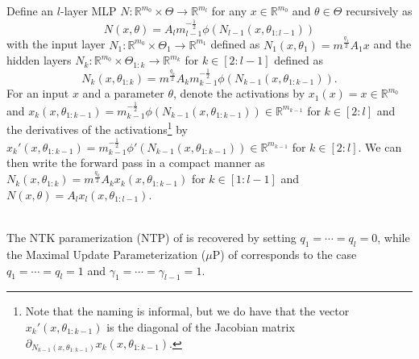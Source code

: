 \documentclass[twoside,11pt]{article}
\newcommand{\R}{\mathbb{R}}
\begin{document}
Define an $l$-layer MLP $N : \R^{m_0} \times \Theta \to \R^{m_l}$ for any $x \in \R^{m_0}$ and $\theta \in \Theta$ recursively as 
\[
N(x,\theta) = A_l m_{l-1}^{-\frac{1}{2}} \phi(N_{l-1}(x,\theta_{1 : l-1}))
\]
with the input layer $N_1 : \R^{m_0} \times \Theta_1 \to \R^{m_1}$ defined as $N_1(x,\theta_1) = m^{\frac{q_1}{2}} A_1 x$ and the hidden layers $N_k : \R^{m_0} \times \Theta_{1:k} \to \R^{m_k}$ for $k \in [2:l-1]$ defined as
\[
N_k(x,\theta_{1:k}) = m^{\frac{q_k}{2}} A_k m_{k-1}^{-\frac{1}{2}} \phi(N_{k-1}(x,\theta_{1 : k-1})).
\]
For an input $x$ and a parameter $\theta$, denote the activations by $x_1(x) = x \in \R^{m_0}$ and $x_k(x, \theta_{1 : k-1}) = m_{k-1}^{-\frac{1}{2}} \phi(N_{k-1}(x, \theta_{1 : k-1})) \in \R^{m_{k-1}}$ for $k \in [2:l]$ and the derivatives of the activations\footnote{Note that the naming is informal, but we do have that the vector $x_k'(x,\theta_{1 : k-1})$ is the diagonal of the Jacobian matrix $\partial_{N_{k-1}(x,\theta_{1 : k-1})} x_k(x, \theta_{1 : k-1})$.} by $x_k'(x,\theta_{1 : k-1}) = m_{k-1}^{-\frac{1}{2}} \phi'(N_{k-1}(x,\theta_{1 : k-1})) \in \R^{m_{k-1}}$ for $k \in [2:l]$. We can then write the forward pass in a compact manner as $N_k(x,\theta_{1:k}) = m^{\frac{q_k}{2}} A_k x_k(x,\theta_{1:k-1})$ for $k \in [1:l-1]$ and $N(x,\theta) = A_l x_l(x,\theta_{1:l-1})$.

\begin{remark}~\\
The NTK paramerization (NTP) of \citet{Jacotetal2018} is recovered by setting $q_1=\cdots=q_l=0$, while the Maximal Update Parameterization ($\mu$P) of \citet{Yangetal2022} corresponds to the case $q_1=\cdots=q_l=1$ and $\gamma_1 = \cdots = \gamma_{l-1} = 1$.
\end{remark}
\end{document}
